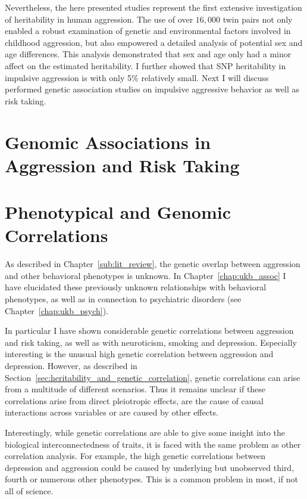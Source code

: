 Nevertheless, the here presented studies represent the first extensive investigation of heritability in human aggression.
The use of over $16,000$ twin pairs not only enabled a robust examination of genetic and environmental factors involved in childhood aggression, but also empowered a detailed analysis of potential sex and age differences.
This analysis demonstrated that sex and age only had a minor affect on the estimated heritability.
I further showed that SNP heritability in impulsive aggression is with only 5\% relatively small.
Next I will discuss performed genetic association studies on impulsive aggressive behavior as well as risk taking. 

\section{Genomic Associations in Aggression and Risk Taking}
\label{sec:genomic_associations_in_aggression_and_risk_taking}

\section{Phenotypical and Genomic Correlations}
\label{sec:phenotypical_and_genomic_correlations}

As described in Chapter~\ref{sub:lit_review}, the genetic overlap between aggression and other behavioral phenotypes is unknown.
In Chapter~\ref{chap:ukb_assoc} I have elucidated these previously unknown relationships with behavioral phenotypes, as well as in connection to psychiatric disorders (see Chapter~\ref{chap:ukb_psych}).

In particular I have shown considerable genetic correlations between aggression and risk taking, as well as with neuroticism, smoking and depression. 
Especially interesting is the unusual high genetic correlation between aggression and depression.
However, as described in Section~\ref{sec:heritability_and_genetic_correlation}, genetic correlations can arise from a multitude of different scenarios.
Thus it remains unclear if these correlations arise from direct pleiotropic effects, are the cause of causal interactions across variables or are caused by other effects. 

Interestingly, while genetic correlations are able to give some insight into the biological interconnectedness of traits, it is faced with the same problem as other correlation analysis. 
For example, the high genetic correlations between depression and aggression could be caused by underlying but unobserved third, fourth or numerous other phenotypes.
This is a common problem in most, if not all of science.

